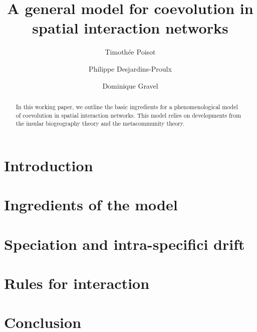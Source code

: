 \documentclass[10pt,twocolumn]{article}
\author{Timoth\'ee Poisot \and Philippe Desjardins-Proulx \and Dominique Gravel}
\title{A general model for coevolution in spatial interaction networks}
\begin{document}
	
\maketitle

\begin{abstract}
	In this working paper, we outline the basic ingredients for a
	phenomenological model of coevolution in spatial interaction networks.
	This model relies on developments from the insular biogeography theory and
	the metacommunity theory.
\end{abstract}

\section{Introduction}

\section{Ingredients of the model}

\section{Speciation and intra-specifici drift}

\section{Rules for interaction}

\section{Conclusion}
\end{document}
